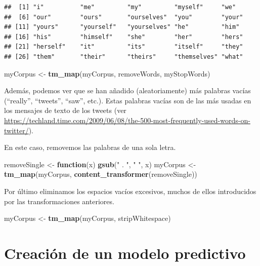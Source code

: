 \documentclass[]{article}
\newenvironment{Shaded}{\begin{snugshade}}{\end{snugshade}}
\newcommand{\ControlFlowTok}[1]{\textcolor[rgb]{0.13,0.29,0.53}{\textbf{#1}}}
\newcommand{\KeywordTok}[1]{\textcolor[rgb]{0.13,0.29,0.53}{\textbf{#1}}}
\newcommand{\NormalTok}[1]{#1}
\newcommand{\StringTok}[1]{\textcolor[rgb]{0.31,0.60,0.02}{#1}}
\begin{document}
\begin{verbatim}
##  [1] "i"          "me"         "my"         "myself"     "we"        
##  [6] "our"        "ours"       "ourselves"  "you"        "your"      
## [11] "yours"      "yourself"   "yourselves" "he"         "him"       
## [16] "his"        "himself"    "she"        "her"        "hers"      
## [21] "herself"    "it"         "its"        "itself"     "they"      
## [26] "them"       "their"      "theirs"     "themselves" "what"
\end{verbatim}

\begin{Shaded}
\begin{Highlighting}[]
\NormalTok{myCorpus <-}\StringTok{ }\KeywordTok{tm_map}\NormalTok{(myCorpus, removeWords, myStopWords) }
\end{Highlighting}
\end{Shaded}

Además, podemos ver que se han añadido (aleatoriamente) más palabras
vacías (``really'', ``tweets'', ``saw'', etc.). Estas palabras vacías
son de las más usadas en los mensajes de texto de los tweets (ver
\url{https://techland.time.com/2009/06/08/the-500-most-frequently-used-words-on-twitter/}).

En este caso, removemos las palabras de una sola letra.

\begin{Shaded}
\begin{Highlighting}[]
\NormalTok{removeSingle <-}\StringTok{ }\ControlFlowTok{function}\NormalTok{(x) }\KeywordTok{gsub}\NormalTok{(}\StringTok{" . "}\NormalTok{, }\StringTok{" "}\NormalTok{, x)   }
\NormalTok{myCorpus <-}\StringTok{ }\KeywordTok{tm_map}\NormalTok{(myCorpus, }\KeywordTok{content_transformer}\NormalTok{(removeSingle))}
\end{Highlighting}
\end{Shaded}

Por último eliminamos los espacios vacíos excesivos, muchos de ellos
introducidos por las transformaciones anteriores.

\begin{Shaded}
\begin{Highlighting}[]
\NormalTok{myCorpus <-}\StringTok{ }\KeywordTok{tm_map}\NormalTok{(myCorpus, stripWhitespace)}
\end{Highlighting}
\end{Shaded}

\hypertarget{creaciuxf3n-de-un-modelo-predictivo}{%
\section{Creación de un modelo
predictivo}\label{creaciuxf3n-de-un-modelo-predictivo}}
\end{document}
